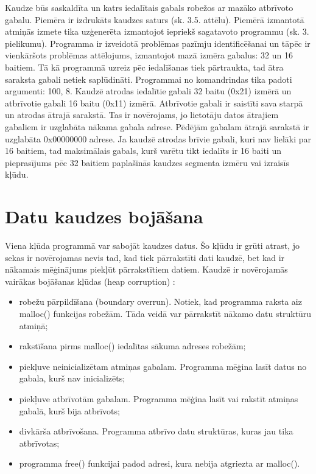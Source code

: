 Kaudze būs saskaldīta un katrs iedalītais gabals robežos ar mazāko atbrīvoto gabalu.
Piemēra ir izdrukāts kaudzes saturs (sk. 3.5. attēlu).
Piemērā izmantotā atmiņās izmete tika uzģenerēta izmantojot iepriekš sagatavoto programmu (sk. 3. pielikumu).
Programma ir izveidotā problēmas pazīmju identificēšanai un tāpēc ir vienkāršots problēmas attēlojums, izmantojot mazā izmēra gabalus: 32 un 16 baitiem.
Tā kā programmā uzreiz pēc iedalīšanas tiek pārtraukta, tad ātra saraksta gabali netiek saplūdināti.
Programmai no komandrindas tika padoti argumenti: 100, 8.
Kaudzē atrodas iedalītie gabali 32 baitu (0x21) izmērā un atbrīvotie gabali 16 baitu (0x11) izmērā.
Atbrīvotie gabali ir saistīti sava starpā un atrodas ātrajā sarakstā.
Tas ir novērojams, jo lietotāju datos ātrajiem gabaliem ir uzglabāta nākama gabala adrese.
Pēdējām gabalam ātrajā sarakstā ir uzglabāta 0x00000000 adrese.
Ja kaudzē atrodas brīvie gabali, kuri nav lielāki par 16 baitiem, tad maksimālais gabals, kurš varētu tikt iedalīts ir 16 baiti un pieprasījums pēc 32 baitiem paplašinās kaudzes segmenta izmēru vai izraisīs kļūdu.

\section{Datu kaudzes bojāšana}

Viena kļūda programmā var sabojāt kaudzes datus. 
Šo kļūdu ir grūti atrast, jo sekas ir novērojamas nevis tad, kad tiek pārrakstīti dati kaudzē, bet kad ir nākamais mēģinājums piekļūt pārrakstītiem datiem.
Kaudzē ir novērojamās vairākas bojāšanas kļūdas (heap corruption) \cite{DHC}:
\begin{itemize}
\item robežu pārpildīšana (boundary overrun). Notiek, kad programma raksta aiz malloc() funkcijas robežām.
Tāda veidā var pārrakstīt nākamo datu struktūru atmiņā; 
\item rakstīšana pirms malloc() iedalītas sākuma adreses robežām;
\item piekļuve neinicializētam atmiņas gabalam. Programma mēģina lasīt datus no gabala, kurš nav inicializēts;
\item piekļuve atbrīvotām gabalam. Programma mēģina lasīt vai rakstīt atmiņas gabalā, kurš bija atbrīvots;
\item divkārša atbrīvošana. Programma atbrīvo datu struktūras, kuras jau tika atbrīvotas;
\item programma free() funkcijai padod adresi, kura nebija atgriezta ar malloc().
\end{itemize}



